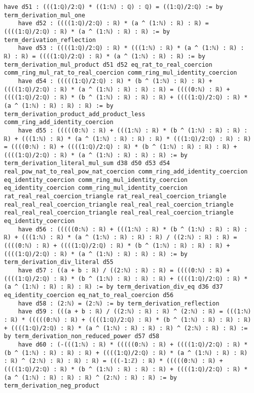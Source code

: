 \documentclass{article}
\begin{document}
\begin{tcolorbox}[colback=white!10, width=\linewidth]
\begin{lstlisting}[language=Lean4]
    have d51 : (((1:ℚ)/2:ℚ) * ((1:ℕ) : ℚ) : ℚ) = ((1:ℚ)/2:ℚ) := by term_derivation_mul_one
    have d52 : ((((1:ℚ)/2:ℚ) : ℝ) * (a ^ (1:ℕ) : ℝ) : ℝ) = ((((1:ℚ)/2:ℚ) : ℝ) * (a ^ (1:ℕ) : ℝ) : ℝ) := by term_derivation_reflection
    have d53 : ((((1:ℚ)/2:ℚ) : ℝ) * (((1:ℕ) : ℝ) * (a ^ (1:ℕ) : ℝ) : ℝ) : ℝ) = ((((1:ℚ)/2:ℚ) : ℝ) * (a ^ (1:ℕ) : ℝ) : ℝ) := by term_derivation_mul_product d51 d52 eq_rat_to_real_coercion comm_ring_mul_rat_to_real_coercion comm_ring_mul_identity_coercion
    have d54 : (((((1:ℚ)/2:ℚ) : ℝ) * (b ^ (1:ℕ) : ℝ) : ℝ) + ((((1:ℚ)/2:ℚ) : ℝ) * (a ^ (1:ℕ) : ℝ) : ℝ) : ℝ) = ((((0:ℕ) : ℝ) + ((((1:ℚ)/2:ℚ) : ℝ) * (b ^ (1:ℕ) : ℝ) : ℝ) : ℝ) + ((((1:ℚ)/2:ℚ) : ℝ) * (a ^ (1:ℕ) : ℝ) : ℝ) : ℝ) := by term_derivation_product_add_product_less comm_ring_add_identity_coercion
    have d55 : (((((0:ℕ) : ℝ) + (((1:ℕ) : ℝ) * (b ^ (1:ℕ) : ℝ) : ℝ) : ℝ) + (((1:ℕ) : ℝ) * (a ^ (1:ℕ) : ℝ) : ℝ) : ℝ) * (((1:ℚ)/2:ℚ) : ℝ) : ℝ) = ((((0:ℕ) : ℝ) + ((((1:ℚ)/2:ℚ) : ℝ) * (b ^ (1:ℕ) : ℝ) : ℝ) : ℝ) + ((((1:ℚ)/2:ℚ) : ℝ) * (a ^ (1:ℕ) : ℝ) : ℝ) : ℝ) := by term_derivation_literal_mul_sum d38 d50 d53 d54 real_pow_nat_to_real_pow_nat_coercion comm_ring_add_identity_coercion eq_identity_coercion comm_ring_mul_identity_coercion eq_identity_coercion comm_ring_mul_identity_coercion rat_real_real_coercion_triangle rat_real_real_coercion_triangle real_real_real_coercion_triangle real_real_real_coercion_triangle real_real_real_coercion_triangle real_real_real_coercion_triangle eq_identity_coercion
    have d56 : (((((0:ℕ) : ℝ) + (((1:ℕ) : ℝ) * (b ^ (1:ℕ) : ℝ) : ℝ) : ℝ) + (((1:ℕ) : ℝ) * (a ^ (1:ℕ) : ℝ) : ℝ) : ℝ) / ((2:ℕ) : ℝ) : ℝ) = ((((0:ℕ) : ℝ) + ((((1:ℚ)/2:ℚ) : ℝ) * (b ^ (1:ℕ) : ℝ) : ℝ) : ℝ) + ((((1:ℚ)/2:ℚ) : ℝ) * (a ^ (1:ℕ) : ℝ) : ℝ) : ℝ) := by term_derivation_div_literal d55
    have d57 : ((a + b : ℝ) / ((2:ℕ) : ℝ) : ℝ) = ((((0:ℕ) : ℝ) + ((((1:ℚ)/2:ℚ) : ℝ) * (b ^ (1:ℕ) : ℝ) : ℝ) : ℝ) + ((((1:ℚ)/2:ℚ) : ℝ) * (a ^ (1:ℕ) : ℝ) : ℝ) : ℝ) := by term_derivation_div_eq d36 d37 eq_identity_coercion eq_nat_to_real_coercion d56
    have d58 : (2:ℕ) = (2:ℕ) := by term_derivation_reflection
    have d59 : (((a + b : ℝ) / ((2:ℕ) : ℝ) : ℝ) ^ (2:ℕ) : ℝ) = (((1:ℕ) : ℝ) * (((((0:ℕ) : ℝ) + ((((1:ℚ)/2:ℚ) : ℝ) * (b ^ (1:ℕ) : ℝ) : ℝ) : ℝ) + ((((1:ℚ)/2:ℚ) : ℝ) * (a ^ (1:ℕ) : ℝ) : ℝ) : ℝ) ^ (2:ℕ) : ℝ) : ℝ) := by term_derivation_non_reduced_power d57 d58
    have d60 : (-(((1:ℕ) : ℝ) * (((((0:ℕ) : ℝ) + ((((1:ℚ)/2:ℚ) : ℝ) * (b ^ (1:ℕ) : ℝ) : ℝ) : ℝ) + ((((1:ℚ)/2:ℚ) : ℝ) * (a ^ (1:ℕ) : ℝ) : ℝ) : ℝ) ^ (2:ℕ) : ℝ) : ℝ) : ℝ) = (((-1:ℤ) : ℝ) * (((((0:ℕ) : ℝ) + ((((1:ℚ)/2:ℚ) : ℝ) * (b ^ (1:ℕ) : ℝ) : ℝ) : ℝ) + ((((1:ℚ)/2:ℚ) : ℝ) * (a ^ (1:ℕ) : ℝ) : ℝ) : ℝ) ^ (2:ℕ) : ℝ) : ℝ) := by term_derivation_neg_product

\end{lstlisting}
\end{tcolorbox}
\end{document}
